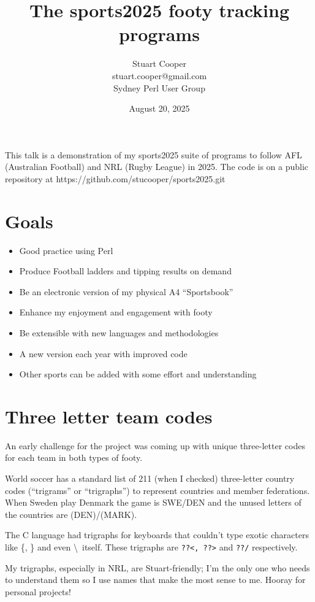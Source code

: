 \documentclass{article}      %
\title{The sports2025 footy tracking programs}
\author{Stuart Cooper\\stuart.cooper@gmail.com\\Sydney Perl User Group}
\date{August 20, 2025}
\begin{document}

\maketitle                   %

This talk is a demonstration of my sports2025 suite of programs to
follow AFL (Australian Football) and NRL (Rugby League) in 2025.
The code is on a public repository at
https://github.com/stucooper/sports2025.git

\section{Goals}

\begin{itemize}
  \item Good practice using Perl
  \item Produce Football ladders and tipping results on demand
  \item Be an electronic version of my physical A4 ``Sportsbook''
  \item Enhance my enjoyment and engagement with footy
  \item Be extensible with new languages and methodologies
  \item A new version each year with improved code
  \item Other sports can be added with some effort and understanding
\end{itemize}

\section{Three letter team codes}

An early challenge for the project was coming up with unique
three-letter codes for each team in both types of footy.

World soccer has a standard list of 211 (when I checked) three-letter
country codes (``trigrams'' or ``trigraphs'') to represent countries
and member federations. When Sweden play Denmark the game is
SWE/DEN and the unused letters of the countries are (DEN)/(MARK).

The C language had trigraphs for keyboards that couldn't type exotic
characters like \{, \} and even \textbackslash\ itself. These
trigraphs are \verb!??<, ??>! and \verb!??/! respectively.

My trigraphs, especially in NRL, are Stuart-friendly; I'm the only one
who needs to understand them so I use names that make the most sense
to me. Hooray for personal projects!
\end{document}

